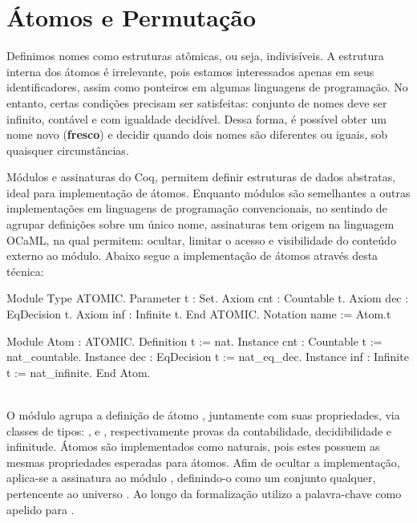 
\section{Átomos e Permutação}\label{sec:atomos-permutacao}
Definimos nomes como estruturas atômicas, ou seja, indivisíveis. A estrutura interna dos átomos é irrelevante, pois estamos interessados apenas em seus identificadores, assim como ponteiros em algumas linguagens de programação. No entanto, certas condições precisam ser satisfeitas: conjunto de nomes deve ser infinito, contável e com igualdade decidível. Dessa forma, é possível obter um nome novo (\textbf{fresco}) e decidir quando dois nomes são diferentes ou iguais, sob quaisquer circunstâncias.

Módulos e assinaturas do Coq, permitem definir estruturas de dados abstratas, ideal para implementação de átomos. Enquanto módulos são semelhantes a outras implementações em linguagens de programação convencionais, no sentindo de agrupar definições sobre um único nome, assinaturas tem origem na linguagem OCaML, na qual permitem: ocultar, limitar o acesso e visibilidade do conteúdo externo ao módulo. Abaixo segue a implementação de átomos através desta técnica:
\vspace*{.4em}\\
\begin{minipage}[t]{0.5\linewidth}
\begin{coqcode}
Module Type ATOMIC.
  Parameter t : Set.
  Axiom cnt : Countable t.
  Axiom dec : EqDecision t.
  Axiom inf : Infinite t.
End ATOMIC.
Notation name := Atom.t
\end{coqcode}
\end{minipage}
\hspace{-5em}
\begin{minipage}[t]{0.5\linewidth}
\begin{coqcode}
Module Atom : ATOMIC.
  Definition t := nat.
  Instance cnt : Countable t := nat_countable.
  Instance dec : EqDecision t := nat_eq_dec.
  Instance inf : Infinite t := nat_infinite.
End Atom.
\end{coqcode}
\end{minipage}
\vspace*{1em}\\
O módulo  agrupa a definição de átomo , juntamente com suas propriedades, via classes de tipos: ,  e , respectivamente provas da contabilidade, decidibilidade e infinitude. Átomos são implementados como naturais, pois estes possuem as mesmas propriedades esperadas para átomos. Afim de ocultar a implementação, aplica-se a assinatura  ao módulo , definindo-o como um conjunto qualquer, pertencente ao universo . Ao longo da formalização utilizo a palavra-chave  como apelido para .

